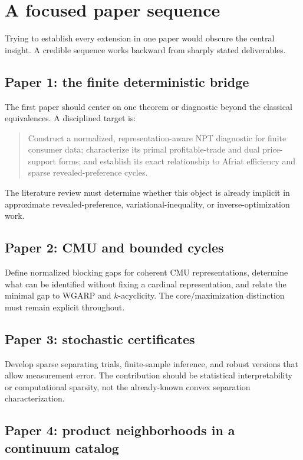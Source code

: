 \documentclass[11pt]{article}
\theoremstyle{definition}
\theoremstyle{remark}
\begin{document}
\section{A focused paper sequence}

Trying to establish every extension in one paper would obscure the central insight.  A credible
sequence works backward from sharply stated deliverables.

\subsection*{Paper 1: the finite deterministic bridge}

The first paper should center on one theorem or diagnostic beyond the classical equivalences.
A disciplined target is:
\begin{quote}
Construct a normalized, representation-aware NPT diagnostic for finite consumer data; characterize
its primal profitable-trade and dual price-support forms; and establish its exact relationship to
Afriat efficiency and sparse revealed-preference cycles.
\end{quote}
The literature review must determine whether this object is already implicit in approximate
revealed-preference, variational-inequality, or inverse-optimization work.

\subsection*{Paper 2: CMU and bounded cycles}

Define normalized blocking gaps for coherent CMU representations, determine what can be identified
without fixing a cardinal representation, and relate the minimal gap to WGARP and $k$-acyclicity.
The core/maximization distinction must remain explicit throughout.

\subsection*{Paper 3: stochastic certificates}

Develop sparse separating trials, finite-sample inference, and robust versions that allow
measurement error.  The contribution should be statistical interpretability or computational
sparsity, not the already-known convex separation characterization.

\subsection*{Paper 4: product neighborhoods in a continuum catalog}
\end{document}
